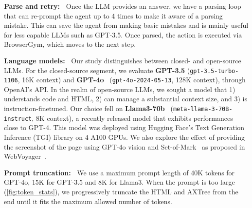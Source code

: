 \documentclass{article}
\theoremstyle{plain}
\theoremstyle{definition}
\theoremstyle{remark}
\newcommand{\paragraphtight}[1]{\textbf{#1~}}
\begin{document}
\paragraphtight{Parse and retry:} Once the LLM provides an answer, we have a parsing loop that can re-prompt the agent up to 4 times to make it aware of a parsing mistake. This can save the agent from making basic mistakes and is mainly useful for less capable LLMs such as GPT-3.5. Once parsed, the action is executed via BrowserGym, which moves to the next step.

\paragraphtight{Language models:} Our study distinguishes between closed- and open-source LLMs. For the closed-source segment, we evaluate \textbf{GPT-3.5} (\texttt{gpt-3.5-turbo-1106}, 16K context) and \textbf{GPT-4o}~\citep{OpenAI2023GPT4TR} (\texttt{gpt-4o-2024-05-13}, 128K context), through OpenAI's API. In the realm of open-source LLMs, we sought a model that 1) understands code and HTML, 2) can manage a substantial context size, and 3) is instruction-finetuned. Our choice fell on \textbf{Llama3-70b}~\citep{meta2024llama3} (\texttt{meta-llama-3-70B-instruct}, 8K context), a recently released model that exhibits performances close to GPT-4. This model was deployed using Hugging Face's Text Generation Inference (TGI) library on 4 A100 GPUs. We also explore the effect of providing the screenshot of the page using GPT-4o vision and Set-of-Mark~\citep{yang2023set} as proposed in WebVoyager~\citep{he2024webvoyager}.

\paragraphtight{Prompt truncation:} We use a maximum prompt length of 40K tokens for GPT-4o, 15K for GPT-3.5 and 8K for Llama3. When the prompt is too large (\cref{fig:token_stats}), we progressively truncate the HTML and AXTree from the end until it fits the maximum allowed number of tokens.


\newcommand{\gpm}[1]{\textcolor{gray}{\tiny$\pm$#1}}

\end{document}
